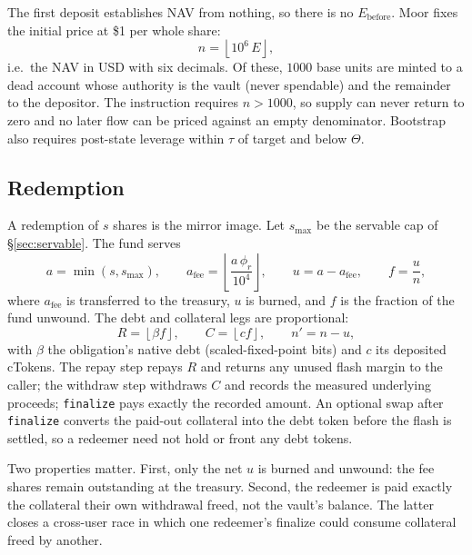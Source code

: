 \documentclass[11pt]{article}
\theoremstyle{remark}
\newcommand{\fl}[1]{\left\lfloor #1 \right\rfloor}
\newcommand{\BPS}{10^{4}}
\newcommand{\NAV}{E}
\begin{document}
The first deposit establishes NAV from nothing, so there is no $\NAV_{\mathrm{before}}$. Moor fixes the initial price at \$1 per whole share:
\begin{equation}
n = \fl{10^{6}\,\NAV},
\label{eq:bootstrap}
\end{equation}
i.e.\ the NAV in USD with six decimals. Of these, $1000$ base units are minted to a dead account whose authority is the vault (never spendable) and the remainder to the depositor. The instruction requires $n > 1000$, so supply can never return to zero and no later flow can be priced against an empty denominator. Bootstrap also requires post-state leverage within $\tau$ of target and below $\Theta$.

\subsection{Redemption}

A redemption of $s$ shares is the mirror image. Let $s_{\max}$ be the servable cap of \S\ref{sec:servable}. The fund serves
\begin{equation}
a = \min(s, s_{\max}),
\qquad
a_{\mathrm{fee}} = \fl{\frac{a\,\phi_r}{\BPS}},
\qquad
u = a - a_{\mathrm{fee}},
\qquad
f = \frac{u}{n},
\label{eq:redeem}
\end{equation}
where $a_{\mathrm{fee}}$ is transferred to the treasury, $u$ is burned, and $f$ is the fraction of the fund unwound. The debt and collateral legs are proportional:
\begin{equation}
R = \fl{\beta f},
\qquad
C = \fl{c f},
\qquad
n' = n - u,
\label{eq:redeem-legs}
\end{equation}
with $\beta$ the obligation's native debt (scaled-fixed-point bits) and $c$ its deposited cTokens. The repay step repays $R$ and returns any unused flash margin to the caller; the withdraw step withdraws $C$ and records the measured underlying proceeds; \texttt{finalize} pays exactly the recorded amount. An optional swap after \texttt{finalize} converts the paid-out collateral into the debt token before the flash is settled, so a redeemer need not hold or front any debt tokens.

Two properties matter. First, only the net $u$ is burned and unwound: the fee shares remain outstanding at the treasury. Second, the redeemer is paid exactly the collateral their own withdrawal freed, not the vault's balance. The latter closes a cross-user race in which one redeemer's finalize could consume collateral freed by another.
\end{document}
